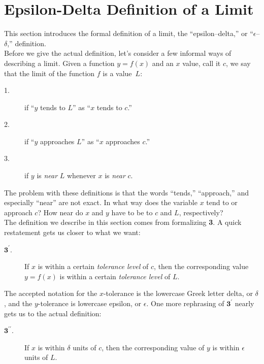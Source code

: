 
\section{Epsilon-Delta Definition of a Limit}\label{sec:limit_def}

This section introduces the formal definition of a limit, the ``epsilon--delta,'' or ``$\epsilon$--$\delta$,'' definition.\\

Before we give the actual definition, let's consider a few informal ways of describing a limit.  Given a function $y=f(x)$ and an $x$ value, call it $c$, we say that the limit of the function $f$ is a value~$L$: 

\begin{description}
\item[1.]if ``$y$ tends to $L$'' as ``$x$ tends to $c$.''
\item[2.]if ``$y$ approaches $L$'' as ``$x$ approaches $c$.''
\item[3.]if $y$ is \textit{near} $L$ whenever $x$ is \textit{near} $c$.
\end{description}

The problem with these definitions is that the words ``tends,'' ``approach,'' and especially ``near'' are not exact.  In what way does the variable $x$ tend to or approach $c$? How near do $x$ and $y$ have to be to $c$ and $L$, respectively?  \\

The definition we describe in this section comes from formalizing {\bf 3}.  A quick restatement gets us closer to what we want:

\begin{description}
\item[$\textbf{3}^\prime$.]If $x$ is within a certain \textit{tolerance level} of $c$, then the corresponding value $y=f(x)$ is within a certain \textit{tolerance level} of $L$.
\end{description}

The accepted notation for the $x$-tolerance is the lowercase Greek letter delta, or $\delta$, and the $y$-tolerance is lowercase epsilon, or $\epsilon$. One more rephrasing of $\textbf{3}^\prime$ nearly gets us to the actual definition:

\begin{description}
\item[$\textbf{3}^{\prime \prime}$.]If $x$ is within $\delta$ units of $c$, then the corresponding value of $y$ is within $\epsilon$ units of $L$.
\end{description}

